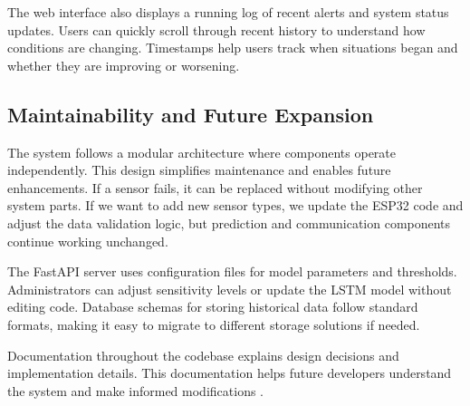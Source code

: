 The web interface also displays a running log of recent alerts and system status updates. Users can quickly scroll through recent history to understand how conditions are changing. Timestamps help users track when situations began and whether they are improving or worsening.

\subsection{Maintainability and Future Expansion}

The system follows a modular architecture where components operate independently. This design simplifies maintenance and enables future enhancements. If a sensor fails, it can be replaced without modifying other system parts. If we want to add new sensor types, we update the ESP32 code and adjust the data validation logic, but prediction and communication components continue working unchanged.

The FastAPI server uses configuration files for model parameters and thresholds. Administrators can adjust sensitivity levels or update the LSTM model without editing code. Database schemas for storing historical data follow standard formats, making it easy to migrate to different storage solutions if needed.

Documentation throughout the codebase explains design decisions and implementation details. This documentation helps future developers understand the system and make informed modifications \cite{pressman2014software}.

